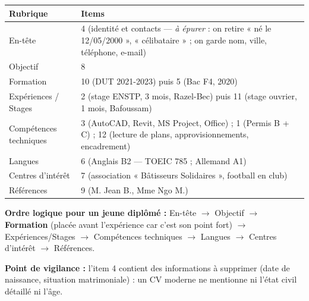 \documentclass[11pt]{article}
\begin{document}
\begin{corrige}
\begin{center}
\begin{tabularx}{\linewidth}{|l|X|}\hline
\rowcolor{popblueL} \textbf{Rubrique} & \textbf{Items} \\ \hline
En-tête & 4 (identité et contacts — \emph{à épurer} : on retire « né le 12/05/2000 », « célibataire » ; on garde nom, ville, téléphone, e-mail) \\ \hline
Objectif & 8 \\ \hline
Formation & 10 (DUT 2021-2023) puis 5 (Bac F4, 2020) \\ \hline
Expériences / Stages & 2 (stage ENSTP, 3 mois, Razel-Bec) puis 11 (stage ouvrier, 1 mois, Bafoussam) \\ \hline
Compétences techniques & 3 (AutoCAD, Revit, MS Project, Office) ; 1 (Permis B + C) ; 12 (lecture de plans, approvisionnements, encadrement) \\ \hline
Langues & 6 (Anglais B2 — TOEIC 785 ; Allemand A1) \\ \hline
Centres d'intérêt & 7 (association « Bâtisseurs Solidaires », football en club) \\ \hline
Références & 9 (M. Jean B., Mme Ngo M.) \\ \hline
\end{tabularx}
\end{center}

\textbf{Ordre logique pour un jeune diplômé :} En-tête $\rightarrow$ Objectif $\rightarrow$ \textbf{Formation} (placée avant l'expérience car c'est son point fort) $\rightarrow$ Expériences/Stages $\rightarrow$ Compétences techniques $\rightarrow$ Langues $\rightarrow$ Centres d'intérêt $\rightarrow$ Références.

\textbf{Point de vigilance :} l'item 4 contient des informations à supprimer (date de naissance, situation matrimoniale) : un CV moderne ne mentionne ni l'état civil détaillé ni l'âge.
\end{corrige}
\end{document}
